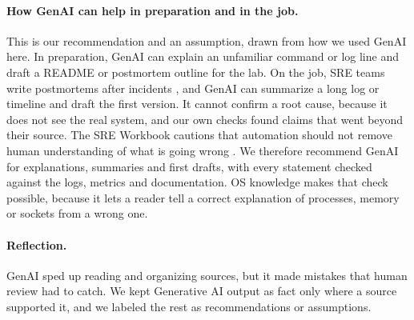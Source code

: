 \paragraph{How GenAI can help in preparation and in the job.}
This is our recommendation and an assumption, drawn from how we used GenAI here. In preparation, GenAI can explain an unfamiliar command or log line and draft a README or postmortem outline for the lab. On the job, SRE teams write postmortems after incidents \cite{sre-book}, and GenAI can summarize a long log or timeline and draft the first version. It cannot confirm a root cause, because it does not see the real system, and our own checks found claims that went beyond their source. The SRE Workbook cautions that automation should not remove human understanding of what is going wrong \cite{workbook}. We therefore recommend GenAI for explanations, summaries and first drafts, with every statement checked against the logs, metrics and documentation. OS knowledge makes that check possible, because it lets a reader tell a correct explanation of processes, memory or sockets from a wrong one.

\paragraph{Reflection.}
GenAI sped up reading and organizing sources, but it made mistakes that human review had to catch. We kept Generative AI output as fact only where a source supported it, and we labeled the rest as recommendations or assumptions.
